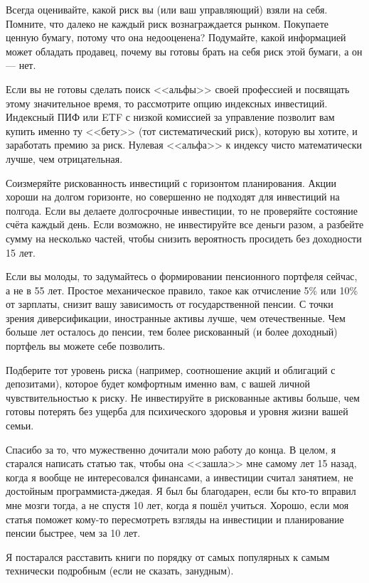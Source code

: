 Всегда оценивайте, какой риск вы (или ваш управляющий) взяли на себя. Помните, 
что далеко не каждый риск вознаграждается рынком. Покупаете ценную бумагу, 
потому что она недооценена? Подумайте, какой информацией может обладать 
продавец, почему вы готовы брать на себя риск этой бумаги, а он --- нет.

Если вы не готовы сделать поиск <<альфы>> своей профессией и посвящать этому
значительное время, то рассмотрите опцию индексных инвестиций. Индексный ПИФ 
или ETF с низкой комиссией за управление позволит вам купить именно ту <<бету>> 
(тот систематический риск), которую вы хотите, и заработать премию за риск. 
Нулевая <<альфа>> к индексу чисто математически лучше, чем отрицательная.

Соизмеряйте рискованность инвестиций с горизонтом планирования. Акции хороши на 
долгом горизонте, но совершенно не подходят для инвестиций на полгода. Если вы 
делаете долгосрочные инвестиции, то не проверяйте состояние счёта каждый день. 
Если возможно, не инвестируйте все деньги разом, а разбейте сумму на несколько 
частей, чтобы снизить вероятность просидеть без доходности 15 лет.

Если вы молоды, то задумайтесь о формировании пенсионного портфеля сейчас, а не 
в 55 лет. Простое механическое правило, такое как отчисление 5\% или 10\% от 
зарплаты, снизит вашу зависимость от государственной пенсии. С точки зрения 
диверсификации, иностранные активы лучше, чем отечественные. Чем больше лет 
осталось до пенсии, тем более рискованный (и более доходный) портфель вы можете 
себе позволить.

Подберите тот уровень риска (например, соотношение акций и облигаций с 
депозитами), которое будет комфортным именно вам, с вашей личной 
чувствительностью к риску. Не инвестируйте в рискованные активы больше, чем 
готовы потерять без ущерба для психического здоровья и уровня жизни вашей 
семьи.

Спасибо за то, что мужественно дочитали мою работу до конца. В целом, я 
старался написать статью так, чтобы она <<зашла>> мне самому лет 15 назад, 
когда я вообще не интересовался финансами, а инвестиции считал занятием, не 
достойным программиста-джедая. Я был бы благодарен, если бы кто-то вправил мне 
мозги тогда, а не спустя 10 лет, когда я пошёл учиться. Хорошо, если моя статья
поможет кому-то пересмотреть взгляды на инвестиции и планирование пенсии 
быстрее, чем за 10 лет.


Я постарался расставить книги по порядку от самых популярных к самым технически 
подробным (если не сказать, занудным).

